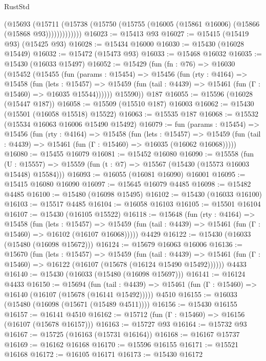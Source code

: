 \begin{lexlean}{RustStd}
\begin{coremodule}
{\begin{coremodule}
{{{{{{{{{{{{{{{{{{{{{{{{{{{{{{{{{{{{{{{{{{{{{{{{{{{{{{{{{{{{              (@15693
                (@15711
                  (@15738 (@15750 (@15755 (@16005 (@15861 @16006) (@15866 (@15868 @93)))))))))))))
@16023 := @15413 @93
@16027 := @15415 (@15419 @93) (@15425 @93)
@16028 := @15434 @16000
@16030 := @15430 (@16028 @15449)
@16032 := @15472 (@15473 @93)
@16033 := @15468 @16032
@16035 := @15430 (@16033 @15497)
@16052 := @15429
    (fun (fn : @76) =>
    @16030
      (@15452
        (@15455
          (fun (params : @15454) =>
          @15456
            (fun (rty : @4164) =>
            @15458
              (fun (lets : @15457) =>
              @15459 (fun (tail : @4439) => @15461 (fun (Γ : @15460) => @16035 @15544))))))
        @15590))
    @187
@16055 := @15596 (@16028 (@15447 @187))
@16058 := @15509 (@15510 @187) @16003
@16062 := @15430 (@15501 (@16058 @15518) @15522)
@16063 := @15535 @187
@16068 := @15532 (@15534 @16063 @16006 @15490 @15492)
@16079 := fun (params : @15454) =>
  @15456
    (fun (rty : @4164) =>
    @15458
      (fun (lets : @15457) =>
      @15459 (fun (tail : @4439) => @15461 (fun (Γ : @15460) => @16035 (@16062 @16068)))))
@16080 := @15455 @16079
@16081 := @15452 @16080
@16090 := @15558
    (fun (U : @15557) => @15559 (fun (t : @7) => @15567 (@15430 (@15573 @16003 @15448) @15584)))
@16093 := @16055 (@16081 @16090) @16001
@16095 := @15415 @16080 @16090
@16097 := @15645 @16079 @4485
@16098 := @15482 @4485
@16100 := @15480 (@16098 @15495)
@16102 := @15430 (@16033 @16100)
@16103 := @15517 @4485
@16104 := @16058 @16103
@16105 := @15501 @16104
@16107 := @15430 (@16105 @15522)
@16118 := @15648
    (fun (rty : @4164) =>
    @15458
      (fun (lets : @15457) =>
      @15459 (fun (tail : @4439) => @15461 (fun (Γ : @15460) => @16102 (@16107 @16068)))))
    @4429
@16122 := @15430 (@16033 (@15480 (@16098 @15672)))
@16124 := @15679 @16063 @16006
@16136 := @15670
    (fun (lets : @15457) =>
    @15459
      (fun (tail : @4439) =>
      @15461 (fun (Γ : @15460) => @16122 (@16107 (@15678 (@16124 @15490 @15492))))))
    @4433
@16140 := @15430 (@16033 (@15480 (@16098 @15697)))
@16141 := @16124 @4433
@16150 := @15694
    (fun (tail : @4439) => @15461 (fun (Γ : @15460) => @16140 (@16107 (@15678 (@16141 @15492)))))
    @4510
@16155 := @16033 (@15480 (@16098 (@15671 (@15489 @4511))))
@16156 := @15430 @16155
@16157 := @16141 @4510
@16162 := @15712 (fun (Γ : @15460) => @16156 (@16107 (@15678 @16157)))
@16163 := @15727 @93
@16164 := @15732 @93
@16167 := @15725 (@16163 (@15731 @16164))
@16168 := @16167 @15737
@16169 := @16162 @16168
@16170 := @15596 @16155
@16171 := @15521 @16168
@16172 := @16105 @16171
@16173 := @15430 @16172
}}}}}}}}}}}}}}}}}}}}}}}}}}}}}}}}}}}}}}}}}}}}}}}}}}}}}}}}}}}}
\end{coremodule}}
\end{coremodule}
\end{lexlean}
